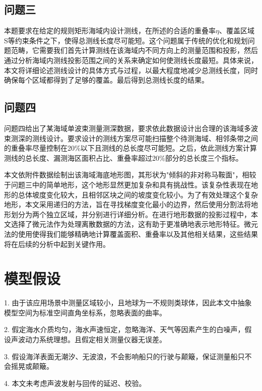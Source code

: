 \documentclass[withoutpreface,bwprint]{cumcmthesis} %
\begin{document}
\subsection{问题三}
本题要求在给定的规则矩形海域内设计测线，在所述的合适的重叠率$\eta$、覆盖区域S等约束条件之下，使得总测线长度尽可能短。这个问题属于传统的优化和规划问题范畴，它需要我们首先计算测线在该海域内不同方向上的测量范围和投影，然后通过分析海域内测线投影范围之间的关系来确定如何使测线长度最短。具体来说，本文将详细论述测线设计的具体方式与过程，以最大程度地减少总测线长度，同时确保每个区域都得到了足够的覆盖。最后得到总测线长度的结果。
\subsection{问题四}

问题四给出了某海域单波束测量测深数据，要求依此数据设计出合理的该海域多波束测深的测线设计。要求设计的测线方案尽可能扫描整个待测海域、相邻条带之间的重叠率尽量控制在20\%以下且测线的总长度尽可能短。之后，依此测线方案计算测线的总长度、漏测海区面积占比、重叠率超过20\%部分的总长度三个指标。

本文依附件数据绘制出该海域海底地形图，其形状为"倾斜的非对称马鞍面"，相较于问题三中的简单地形，这个地形显然更加复杂和具有挑战性。该复杂性表现在地形的总体坡度变化较大，且相邻区块之间的坡度变化较小。为了有效处理这个复杂地形，本文采用递归的方法，旨在寻找梯度变化最小的边界，然后使用分割法将地形划分为两个独立区域，并分别进行详细分析。在进行地形数据的投影过程中，本文选择了微元法作为处理离散数据的方法，这有助于更准确地表示地形特征。微元法的使用使得我们能够精确地计算覆盖面积、重叠率以及其他相关结果，这些结果将在后续的分析中起到关键作用。


\section{模型假设}
1. 由于该应用场景中测量区域较小，且地球为一不规则类球体，因此本文中抽象模型空间为标准空间直角坐标系，忽略表面的曲率。

2. 假定海水介质均匀，海水声速恒定，忽略海洋、天气等因素产生的白噪声，假设声波动力系统理想。且假定相关测量仪器无误差。

3. 假设海洋表面无潮汐、无波浪，不会影响船只的行驶与颠簸，保证测量船只不会摇晃或颠簸。

4. 本文未考虑声波发射与回传的延迟、校验。
\end{document}
